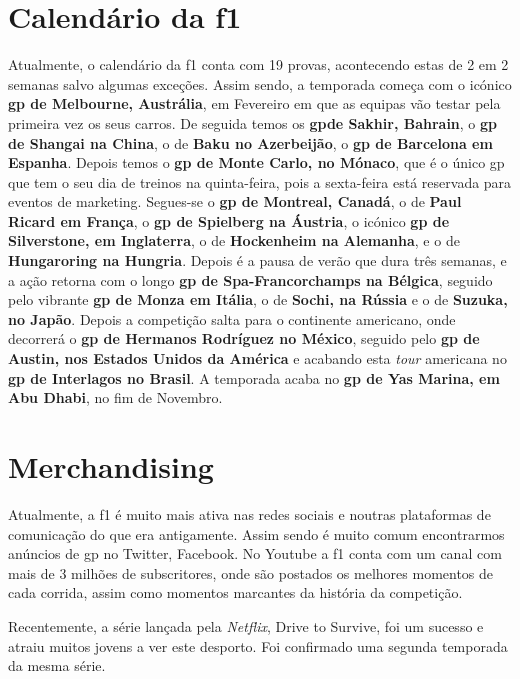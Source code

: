 \documentclass{report}
\begin{document}
\section{Calendário da \ac{f1}}
Atualmente, o calendário da \ac{f1} conta com 19 provas, acontecendo estas de 2 em 2 semanas salvo algumas exceções.
Assim sendo, a temporada começa com o icónico \textbf{\ac{gp} de Melbourne, Austrália}, em Fevereiro em que as equipas vão testar pela primeira vez os seus carros. De seguida temos os \textbf{\ac{gp}de Sakhir, Bahrain}, o \textbf{\ac{gp} de Shangai na China}, o de \textbf{Baku no Azerbeijão}, o \textbf{\ac{gp} de Barcelona em Espanha}. Depois temos o \textbf{\ac{gp} de Monte Carlo, no Mónaco}, que é o único \ac{gp} que tem o seu dia de treinos na quinta-feira, pois a sexta-feira está reservada para eventos de marketing. Segues-se o \textbf{\ac{gp} de Montreal, Canadá}, o de \textbf{Paul Ricard em França}, o \textbf{\ac{gp} de Spielberg na Áustria}, o icónico \textbf{\ac{gp} de Silverstone, em Inglaterra}, o de \textbf{Hockenheim na Alemanha}, e o de \textbf{Hungaroring na Hungria}. Depois é a pausa de verão que dura três semanas, e a ação retorna com o longo \textbf{\ac{gp} de Spa-Francorchamps na Bélgica}, seguido pelo vibrante \textbf{\ac{gp} de Monza em Itália}, o de \textbf{Sochi, na Rússia} e o de \textbf{Suzuka, no Japão}. Depois a competição salta para o continente americano, onde decorrerá o \textbf{\ac{gp} de Hermanos Rodríguez no México}, seguido pelo \textbf{\ac{gp} de Austin, nos Estados Unidos da América} e acabando esta \textit{tour} americana no \textbf{\ac{gp} de Interlagos no Brasil}. A temporada acaba no \textbf{\ac{gp} de Yas Marina, em Abu Dhabi}, no fim de Novembro.  
\section{Merchandising}
Atualmente, a \ac{f1} é muito mais ativa nas redes sociais e noutras plataformas de comunicação do que era antigamente. Assim sendo é muito comum encontrarmos anúncios de \ac{gp} no Twitter, Facebook. No Youtube a \ac{f1} conta com um canal com mais de 3 milhões de subscritores, onde são postados os melhores momentos de cada corrida, assim como momentos marcantes da história da competição.

Recentemente, a série lançada pela \textit{Netflix}, Drive to Survive, foi um sucesso e atraiu muitos jovens a ver este desporto. Foi confirmado uma segunda temporada da mesma série. 
\end{document}
